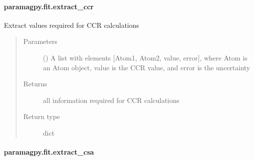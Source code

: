 \documentclass[a4paper,10pt,english,openany,oneside]{sphinxmanual}
\begin{document}
\paragraph{paramagpy.fit.extract\_ccr}
\label{\detokenize{reference/generated/paramagpy.fit.extract_ccr:paramagpy-fit-extract-ccr}}\label{\detokenize{reference/generated/paramagpy.fit.extract_ccr::doc}}

\begin{fulllineitems}
\label{\detokenize{reference/generated/paramagpy.fit.extract_ccr:paramagpy.fit.extract_ccr}}
Extract values required for CCR calculations
\begin{quote}\begin{description}
\item[{Parameters}] \leavevmode
{} () \textendash{} A list with elements {[}Atom1, Atom2, value, error{]}, where Atom is
an Atom object, value is the CCR value, and error is the uncertainty

\item[{Returns}] \leavevmode
{} \textendash{} all information required for CCR calculations

\item[{Return type}] \leavevmode
dict

\end{description}\end{quote}

\end{fulllineitems}



\paragraph{paramagpy.fit.extract\_csa}
\label{\detokenize{reference/generated/paramagpy.fit.extract_csa:paramagpy-fit-extract-csa}}\label{\detokenize{reference/generated/paramagpy.fit.extract_csa::doc}}
\end{document}
